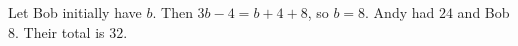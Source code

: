 Let Bob initially have $b$. Then $3b-4=b+4+8$, so $b=8$. Andy had $\boxed{24}$ and Bob $\boxed8$. Their total is $\boxed{32}$.
